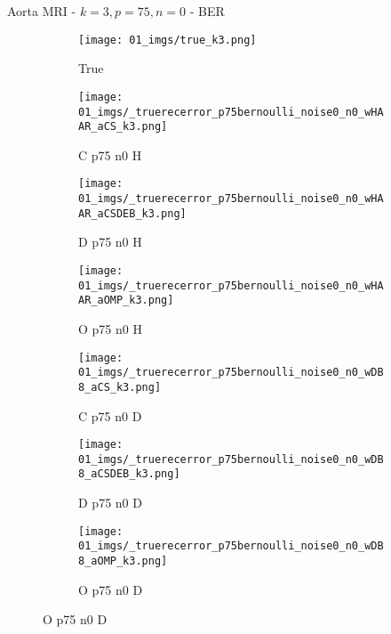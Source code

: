 \begin{frame}{Aorta MRI - $k=3,p=75,n=0$ - BER}{}
\begin{figure}
\begin{subfigure}{0.13\textwidth}
\texttt{[image: 01\_imgs/true\_k3.png]}
\caption*{\tiny True}
\end{subfigure}
\begin{subfigure}{0.13\textwidth}
\texttt{[image: 01\_imgs/\_truerecerror\_p75bernoulli\_noise0\_n0\_wHAAR\_aCS\_k3.png]}
\caption*{\tiny C p75 n0 H}
\end{subfigure}
\begin{subfigure}{0.13\textwidth}
\texttt{[image: 01\_imgs/\_truerecerror\_p75bernoulli\_noise0\_n0\_wHAAR\_aCSDEB\_k3.png]}
\caption*{\tiny D p75 n0 H}
\end{subfigure}
\begin{subfigure}{0.13\textwidth}
\texttt{[image: 01\_imgs/\_truerecerror\_p75bernoulli\_noise0\_n0\_wHAAR\_aOMP\_k3.png]}
\caption*{\tiny O p75 n0 H}
\end{subfigure}
\begin{subfigure}{0.13\textwidth}
\texttt{[image: 01\_imgs/\_truerecerror\_p75bernoulli\_noise0\_n0\_wDB8\_aCS\_k3.png]}
\caption*{\tiny C p75 n0 D}
\end{subfigure}
\begin{subfigure}{0.13\textwidth}
\texttt{[image: 01\_imgs/\_truerecerror\_p75bernoulli\_noise0\_n0\_wDB8\_aCSDEB\_k3.png]}
\caption*{\tiny D p75 n0 D}
\end{subfigure}
\begin{subfigure}{0.13\textwidth}
\texttt{[image: 01\_imgs/\_truerecerror\_p75bernoulli\_noise0\_n0\_wDB8\_aOMP\_k3.png]}
\caption*{\tiny O p75 n0 D}
\end{subfigure}
\end{figure}
\end{frame}

